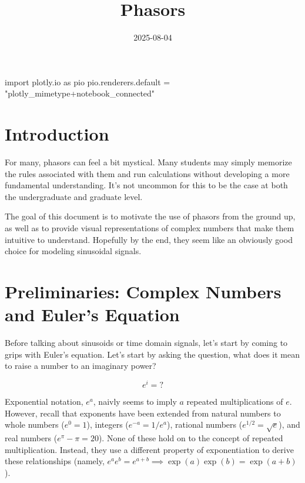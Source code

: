 \documentclass[
  letterpaper,
  DIV=11,
  numbers=noendperiod]{scrartcl}
\title{Phasors}
\author{}
\date{2025-08-04}
\newenvironment{Shaded}{\begin{snugshade}}{\end{snugshade}}
\newcommand{\ImportTok}[1]{\textcolor[rgb]{0.00,0.46,0.62}{#1}}
\newcommand{\NormalTok}[1]{\textcolor[rgb]{0.00,0.23,0.31}{#1}}
\newcommand{\OperatorTok}[1]{\textcolor[rgb]{0.37,0.37,0.37}{#1}}
\newcommand{\StringTok}[1]{\textcolor[rgb]{0.13,0.47,0.30}{#1}}
\begin{document}
\maketitle


\begin{Shaded}
\begin{Highlighting}[]
\ImportTok{import}\NormalTok{ plotly.io }\ImportTok{as}\NormalTok{ pio}
\NormalTok{pio.renderers.default }\OperatorTok{=} \StringTok{"plotly\_mimetype+notebook\_connected"}
\end{Highlighting}
\end{Shaded}

\section{Introduction}\label{introduction}

For many, phasors can feel a bit mystical. Many students may simply
memorize the rules associated with them and run calculations without
developing a more fundamental understanding. It's not uncommon for this
to be the case at both the undergraduate and graduate level.

The goal of this document is to motivate the use of phasors from the
ground up, as well as to provide visual representations of complex
numbers that make them intuitive to understand. Hopefully by the end,
they seem like an obviously good choice for modeling sinusoidal signals.

\section{Preliminaries: Complex Numbers and Euler's
Equation}\label{preliminaries-complex-numbers-and-eulers-equation}

Before talking about sinusoids or time domain signals, let's start by
coming to grips with Euler's equation. Let's start by asking the
question, what does it mean to raise a number to an imaginary power?

\[ e^i = ?\]

Exponential notation, \(e^a\), naivly seems to imply \(a\) repeated
multiplications of \(e\). However, recall that exponents have been
extended from natural numbers to whole numbers (\(e^0 = 1\)), integers
(\(e^{-a} = 1/e^a\)), rational numbers (\(e^{1/2} = \sqrt{e}\)), and
real numbers (\href{https://xkcd.com/217/}{\(e^\pi - \pi = 20\)}). None
of these hold on to the concept of repeated multiplication. Instead,
they use a different property of exponentiation to derive these
relationships (namely,
\(e^ae^b=e^{a+b} \implies \exp(a)\exp(b) = \exp(a+b)\)).
\end{document}
